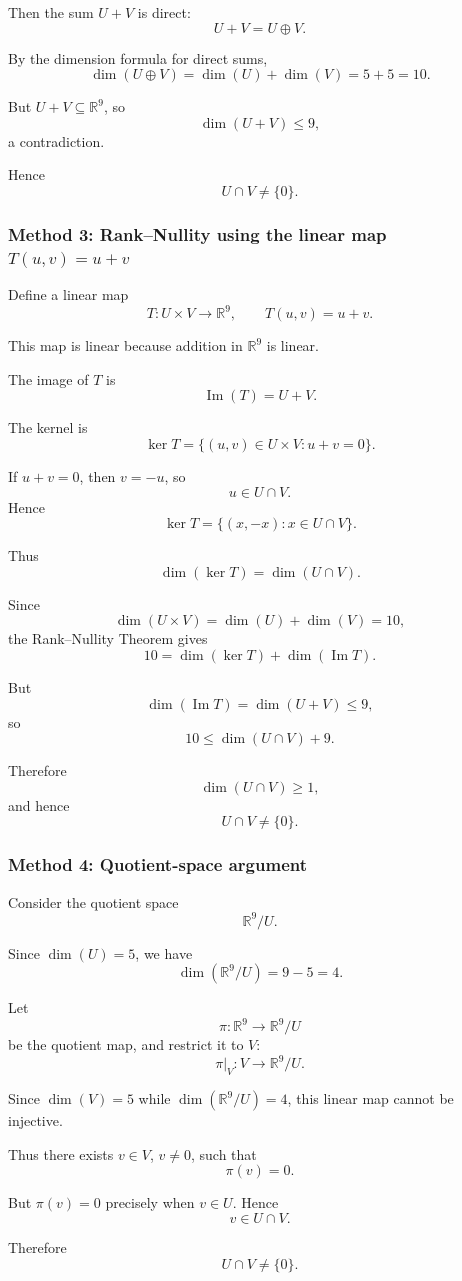 \documentclass[12pt]{article}
\newcommand{\R}{\mathbb{R}}
\newcommand{\dimn}{\operatorname{dim}}
\begin{document}
Then the sum \(U+V\) is direct:
\[
U+V=U\oplus V.
\]

By the dimension formula for direct sums,
\[
\dimn(U\oplus V)=\dimn(U)+\dimn(V)=5+5=10.
\]

But \(U+V\subseteq \R^9\), so
\[
\dimn(U+V)\le 9,
\]
a contradiction.

Hence
\[
\boxed{U\cap V\neq \{0\}.}
\]

\subsubsection{Method 3: Rank--Nullity using the linear map \(T(u,v)=u+v\)}
Define a linear map
\[
T:U\times V\to \R^9,
\qquad
T(u,v)=u+v.
\]

This map is linear because addition in \(\R^9\) is linear.

The image of \(T\) is
\[
\operatorname{Im}(T)=U+V.
\]

The kernel is
\[
\ker T=\{(u,v)\in U\times V: u+v=0\}.
\]

If \(u+v=0\), then \(v=-u\), so
\[
u\in U\cap V.
\]
Hence
\[
\ker T=\{(x,-x):x\in U\cap V\}.
\]

Thus
\[
\dimn(\ker T)=\dimn(U\cap V).
\]

Since
\[
\dimn(U\times V)=\dimn(U)+\dimn(V)=10,
\]
the Rank--Nullity Theorem gives
\[
10=\dimn(\ker T)+\dimn(\operatorname{Im}T).
\]

But
\[
\dimn(\operatorname{Im}T)=\dimn(U+V)\le 9,
\]
so
\[
10\le \dimn(U\cap V)+9.
\]

Therefore
\[
\dimn(U\cap V)\ge 1,
\]
and hence
\[
\boxed{U\cap V\neq \{0\}.}
\]

\newpage
\subsubsection{Method 4: Quotient-space argument}
Consider the quotient space
\[
\R^9/U.
\]

Since \(\dimn(U)=5\), we have
\[
\dimn(\R^9/U)=9-5=4.
\]

Let
\[
\pi:\R^9\to \R^9/U
\]
be the quotient map, and restrict it to \(V\):
\[
\pi|_V:V\to \R^9/U.
\]

Since \(\dimn(V)=5\) while \(\dimn(\R^9/U)=4\), this linear map cannot be injective.

Thus there exists \(v\in V\), \(v\neq 0\), such that
\[
\pi(v)=0.
\]

But \(\pi(v)=0\) precisely when \(v\in U\). Hence
\[
v\in U\cap V.
\]

Therefore
\[
\boxed{U\cap V\neq \{0\}.}
\]
\end{document}
